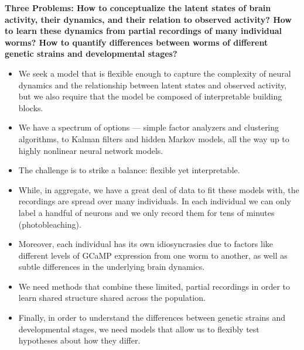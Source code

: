 \documentclass[11pt]{article}
\begin{document}
\textbf{Three Problems: How to conceptualize the latent states of
  brain activity, their dynamics, and their relation to observed
  activity?  How to learn these dynamics from partial recordings of
  many individual worms? How to quantify differences between worms of
  different genetic strains and developmental stages?}
\begin{itemize}
\item We seek a model that is flexible enough to capture the complexity
  of neural dynamics and the relationship between latent states and
  observed activity, but we also require that the model be composed
  of interpretable building blocks. 
\item We have a spectrum of options --- simple factor analyzers and
  clustering algorithms, to Kalman filters and hidden Markov models,
  all the way up to highly nonlinear neural network models.
\item The challenge is to strike a balance: flexible yet interpretable.
\item While, in aggregate, we have a great deal of data to fit these models
  with, the recordings are spread over many individuals. In
  each individual we can only label a handful of neurons and we only
  record them for tens of minutes (photobleaching).
\item Moreover, each individual has its own idiosyncrasies due to
  factors like different levels of GCaMP expression from one worm
  to another, as well as subtle differences in the underlying brain
  dynamics. 
\item We need methods that combine these limited, partial recordings
  in order to learn shared structure shared across the population.
\item Finally, in order to understand the differences between
  genetic strains and developmental stages, we need models that allow
  us to flexibly test hypotheses about how they differ. 
\end{itemize}
\end{document}
